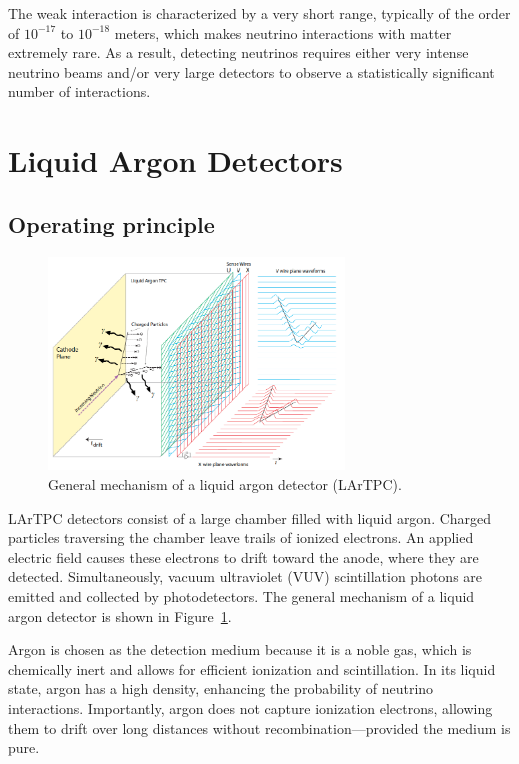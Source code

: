 \documentclass{pracalicmgr}
\begin{document}
The weak interaction is characterized by a very short range, typically of the order of $10^{-17}$ to $10^{-18}$ meters\cite{WeakInteraction}, which makes neutrino interactions with matter extremely rare. As a result, detecting neutrinos requires either very intense neutrino beams and/or very large detectors to observe a statistically significant number of interactions.

\section{Liquid Argon Detectors}

\subsection{Operating principle}

\begin{figure}[H]
    \centering
    \includegraphics[width=0.7\textwidth]{src/LAr_diagram_DUNE.png}
    \caption{General mechanism of a liquid argon detector (LArTPC).\cite{MicroBooNEDesign}}
    \label{fig:lartcp}
\end{figure}

LArTPC detectors consist of a large chamber filled with liquid argon. Charged particles traversing the chamber leave trails of ionized electrons. An applied electric field causes these electrons to drift toward the anode, where they are detected. Simultaneously, vacuum ultraviolet (VUV) scintillation photons are emitted and collected by photodetectors. The general mechanism of a liquid argon detector is shown in Figure~\ref{fig:lartcp}.

Argon is chosen as the detection medium because it is a noble gas, which is chemically inert and allows for efficient ionization and scintillation. In its liquid state, argon has a high density, enhancing the probability of neutrino interactions. Importantly, argon does not capture ionization electrons, allowing them to drift over long distances without recombination—provided the medium is pure.
\end{document}
